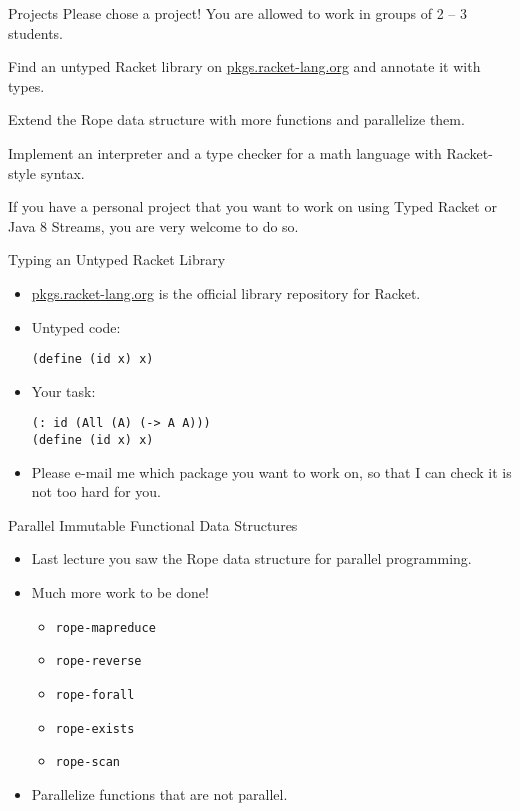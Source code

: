 \documentclass{beamer}
\begin{document}
\begin{frame}{Projects}
  Please chose a project! You are allowed to work in groups of 2 -- 3 students.

  \begin{description}
  \pause{} \item[Typing an Untyped Racket Library] Find an untyped Racket library on \url{pkgs.racket-lang.org} and annotate it with types.
  \pause{} \item[Parallel Immutable Functional Data Structures] Extend the Rope data structure with more functions and parallelize them.
  \pause{} \item[A Tiny Math Language Implementation] Implement an interpreter and a type checker for a math language with Racket-style syntax.
  \pause{} \item[Your own idea?] If you have a personal project that you want to work on using Typed Racket or Java 8 Streams, you are very welcome to do so.
  \end{description}
\end{frame}

\begin{frame}[fragile]{Typing an Untyped Racket Library}
  \begin{itemize}
  \item \url{pkgs.racket-lang.org} is the official library repository for Racket.
  \pause{} \item Untyped code:
    \begin{lstlisting}[style=Racket]
(define (id x) x)
    \end{lstlisting}
  \pause{} \item Your task:
    \begin{lstlisting}[style=Racket]
(: id (All (A) (-> A A)))
(define (id x) x)
    \end{lstlisting}
  \pause{} \item Please e-mail me which package you want to work on, so that I can check it is not too hard for you.
  \end{itemize}
\end{frame}

\begin{frame}{Parallel Immutable Functional Data Structures}
  \begin{itemize}
  \item Last lecture you saw the Rope data structure for parallel programming.
  \pause{} \item Much more work to be done!
    \begin{itemize}
    \item \lstinline[style=Racket]{rope-mapreduce}
    \item \lstinline[style=Racket]{rope-reverse}
    \item \lstinline[style=Racket]{rope-forall}
    \item \lstinline[style=Racket]{rope-exists}
    \item \lstinline[style=Racket]{rope-scan}
    \end{itemize}
  \pause{} \item Parallelize functions that are not parallel.
  \end{itemize}
\end{frame}
\end{document}

